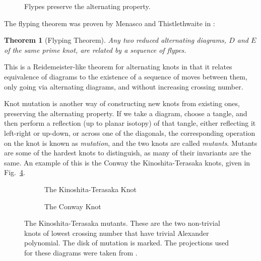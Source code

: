 \documentclass[12pt]{report}
\newtheorem*{theorem}{Theorem}
\theoremstyle{upright}
\begin{document}
\begin{figure}[hbt]
	\centering
	\def\svgscale{0.7}
	{ \scriptsize
	
	}
	\caption{Flypes preserve the alternating property.}
	\label{fig:flype-preservation}
\end{figure}


The flyping theorem was proven by Menasco and Thistlethwaite in \cite[p. 166]{classification-alternating-links}:

\begin{theorem}[Flyping Theorem]
Any two reduced alternating diagrams, $D$ and $E$ of the same prime knot, are related by a sequence of flypes.
\end{theorem}

This is a Reidemeister-like theorem for alternating knots in that it relates equivalence of diagrams to the existence of a sequence of moves between them, only going via alternating diagrams, and without increasing crossing number.

Knot mutation is another way of constructing new knots from existing ones, preserving the alternating property. If we take a diagram, choose a tangle, and then perform a reflection (up to planar isotopy) of that tangle, either reflecting it left-right or up-down, or across one of the diagonals, the corresponding operation on the knot is known as \textit{mutation}, and the two knots are called \textit{mutants}. Mutants are some of the hardest knots to distinguish, as many of their invariants are the same. An example of this is the Conway the Kinoshita-Terasaka knots, given in Fig.~\ref{fig:kinoshita-terasaka-mutants}.

\begin{figure}[hbt!]
	\centering
	\hspace*{\fill}
	\begin{subfigure}[b]{0.4 \textwidth}
		\centering
		\def\svgscale{0.25}
		
		\caption{The Kinoshita-Terasaka Knot}
		\label{fig:kinoshita-terasaka-knot}
	\end{subfigure}
	\hspace*{\fill} \hspace*{\fill}	\hspace*{\fill}
	\begin{subfigure}[b]{0.4 \textwidth}
		\centering
		\def\svgscale{0.25}
		
		\caption{The Conway Knot}
		\label{fig:conway-knot}
	\end{subfigure}
	\hspace*{\fill} 
	\caption{The Kinoshita-Terasaka mutants. These are the two non-trivial knots of lowest crossing number that have trivial Alexander polynomial. The disk of mutation is marked. The projections used for these diagrams were taken from \cite[Fig.~2.32]{the-knot-book}.}
	\label{fig:kinoshita-terasaka-mutants}
\end{figure}
\end{document}
